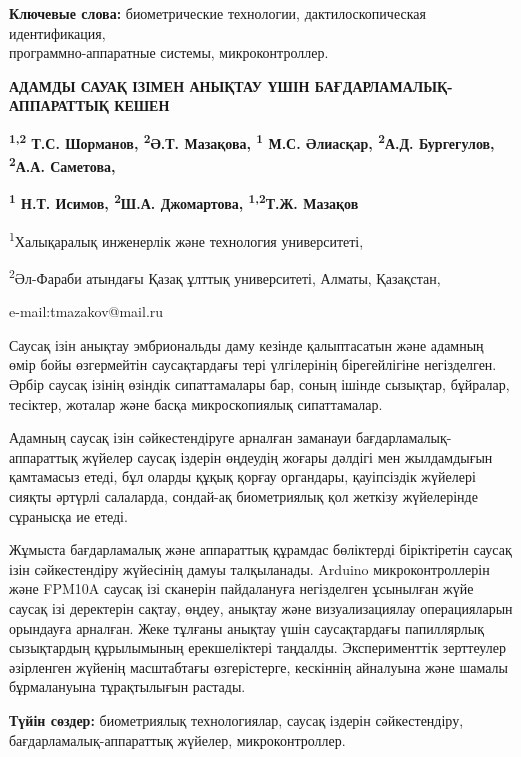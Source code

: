 {\bfseries Ключевые слова:} биометрические технологии, дактилоскопическая
идентификация, \\программно-аппаратные системы, микроконтроллер.

\begin{articleheader}
{\bfseries АДАМДЫ САУАҚ ІЗІМЕН АНЫҚТАУ ҮШІН БАҒДАРЛАМАЛЫҚ-АППАРАТТЫҚ КЕШЕН}

{\bfseries \textsuperscript{1,2} Т.С. Шорманов, \textsuperscript{2}Ә.Т.
Мазақова, \textsuperscript{1} М.С. Әлиасқар, \textsuperscript{2}А.Д.
Бургегулов, \textsuperscript{2}А.А. Саметова,}

{\bfseries \textsuperscript{1} Н.Т. Исимов, \textsuperscript{2}Ш.А.
Джомартова, \textsuperscript{1,2}Т.Ж. Мазақов\textsuperscript{\envelope }}
\end{articleheader}

\begin{affiliation}
\textsuperscript{1}Халықаралық инженерлік және технология университеті,

\textsuperscript{2}Әл-Фараби атындағы Қазақ ұлттық университеті, Алматы,
Қазақстан,

e-mail:tmazakov@mail.ru
\end{affiliation}

Саусақ ізін анықтау эмбриональды даму кезінде қалыптасатын және адамның
өмір бойы өзгермейтін саусақтардағы тері үлгілерінің бірегейлігіне
негізделген. Әрбір саусақ ізінің өзіндік сипаттамалары бар, соның ішінде
сызықтар, бұйралар, тесіктер, жоталар және басқа микроскопиялық
сипаттамалар.

Адамның саусақ ізін сәйкестендіруге арналған заманауи
бағдарламалық-аппараттық жүйелер саусақ іздерін өңдеудің жоғары дәлдігі
мен жылдамдығын қамтамасыз етеді, бұл оларды құқық қорғау органдары,
қауіпсіздік жүйелері сияқты әртүрлі салаларда, сондай-ақ биометриялық
қол жеткізу жүйелерінде сұранысқа ие етеді.

Жұмыста бағдарламалық және аппараттық құрамдас бөліктерді біріктіретін
саусақ ізін сәйкестендіру жүйесінің дамуы талқыланады. Arduino
микроконтроллерін және FPM10A саусақ ізі сканерін пайдалануға
негізделген ұсынылған жүйе саусақ ізі деректерін сақтау, өңдеу, анықтау
және визуализациялау операцияларын орындауға арналған. Жеке тұлғаны
анықтау үшін саусақтардағы папиллярлық сызықтардың құрылымының
ерекшеліктері таңдалды. Эксперименттік зерттеулер әзірленген жүйенің
масштабтағы өзгерістерге, кескіннің айналуына және шамалы бұрмалануына
тұрақтылығын растады.

{\bfseries Түйін сөздер:} биометриялық технологиялар, саусақ іздерін
сәйкестендіру, \\бағдарламалық-аппараттық жүйелер, микроконтроллер.

